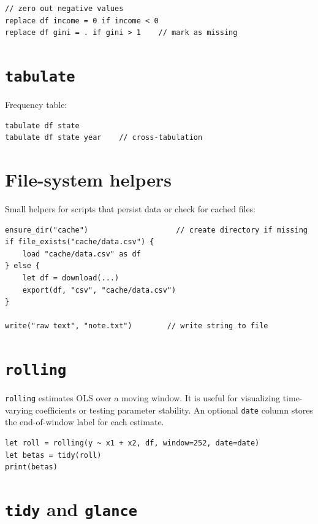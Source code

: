 \begin{lstlisting}
// zero out negative values
replace df income = 0 if income < 0
replace df gini = . if gini > 1    // mark as missing
\end{lstlisting}

\section{\texttt{tabulate}}

Frequency table:

\begin{lstlisting}
tabulate df state
tabulate df state year    // cross-tabulation
\end{lstlisting}

\section{File-system helpers}

Small helpers for scripts that persist data or check for cached files:

\begin{lstlisting}[caption={Cache helpers}]
ensure_dir("cache")                    // create directory if missing
if file_exists("cache/data.csv") {
    load "cache/data.csv" as df
} else {
    let df = download(...)
    export(df, "csv", "cache/data.csv")
}

write("raw text", "note.txt")        // write string to file
\end{lstlisting}

\section{\texttt{rolling}}

\texttt{rolling} estimates OLS over a moving window. It is useful for
visualizing time-varying coefficients or testing parameter stability. An
optional \texttt{date} column stores the end-of-window label for each
estimate.

\begin{lstlisting}[caption={Rolling OLS with end-of-window labels}]
let roll = rolling(y ~ x1 + x2, df, window=252, date=date)
let betas = tidy(roll)
print(betas)
\end{lstlisting}

\section{\texttt{tidy} and \texttt{glance}}

